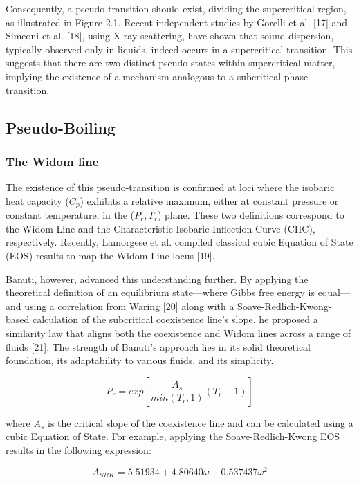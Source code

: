 	Consequently, a pseudo-transition should exist, dividing the supercritical
	region, as illustrated in Figure 2.1. Recent independent studies by Gorelli
	et al. [17] and Simeoni et al. [18], using X-ray scattering, have shown that
	sound dispersion, typically observed only in liquids, indeed occurs in a
	supercritical transition. This suggests that there are two distinct
	pseudo-states within supercritical matter, implying the existence of a
	mechanism analogous to a subcritical phase transition.

	\subsection{Pseudo-Boiling} %
		\subsubsection{The Widom line}
		The existence of this pseudo-transition is confirmed at loci where the
		isobaric heat capacity ($C_p$) exhibits a relative maximum, either at
		constant pressure or constant temperature, in the ($P_r,T_r$) plane.
		These two definitions correspond to the Widom Line and the Characteristic
		Isobaric Inflection Curve (CIIC), respectively. Recently, Lamorgese et al.
		compiled classical cubic Equation of State (EOS) results to map the Widom
		Line locus [19].

		Banuti, however, advanced this understanding further. By applying the
		theoretical definition of an equilibrium state—where Gibbs free energy is
		equal—and using a correlation from Waring [20] along with a
		Soave-Redlich-Kwong-based calculation of the subcritical coexistence line's
		slope, he proposed a similarity law that aligns both the coexistence and
		Widom lines across a range of fluids [21]. The strength of Banuti's approach
		lies in its solid theoretical foundation, its adaptability to various
		fluids, and its simplicity.

		\begin{equation}
			P_r = exp\left[\frac{A_s}{min(T_r,1)}(T_r-1)\right]
		\end{equation}

		where $A_s$ is the critical slope of the coexistence line and can be
		calculated using a cubic Equation of State. For example, applying
		the Soave-Redlich-Kwong EOS results in the following expression:

		\begin{equation}
			A_{SRK} = 5.51934 + 4.80640\omega - 0.537437\omega^2
		\end{equation}
		

